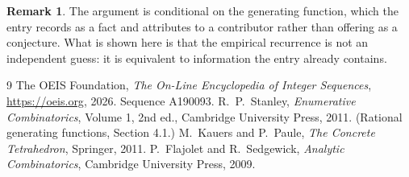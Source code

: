 \documentclass[11pt,a4paper]{article}
\theoremstyle{plain}
\theoremstyle{definition}
\newtheorem{remark}[theorem]{Remark}
\begin{document}
\begin{remark}
The argument is conditional on the generating function, which the entry records as a fact and
attributes to a contributor rather than offering as a conjecture. What is shown here is that
the empirical recurrence is not an independent guess: it is equivalent to information the
entry already contains.
\end{remark}

\begin{thebibliography}{9}
 The OEIS Foundation, \emph{The On-Line Encyclopedia of Integer
Sequences}, \url{https://oeis.org}, 2026. Sequence A190093.
 R.~P.~Stanley, \emph{Enumerative Combinatorics}, Volume 1, 2nd ed.,
Cambridge University Press, 2011. (Rational generating functions, Section 4.1.)
 M.~Kauers and P.~Paule, \emph{The Concrete Tetrahedron}, Springer, 2011.
 P.~Flajolet and R.~Sedgewick, \emph{Analytic Combinatorics}, Cambridge
University Press, 2009.
\end{thebibliography}
\end{document}
